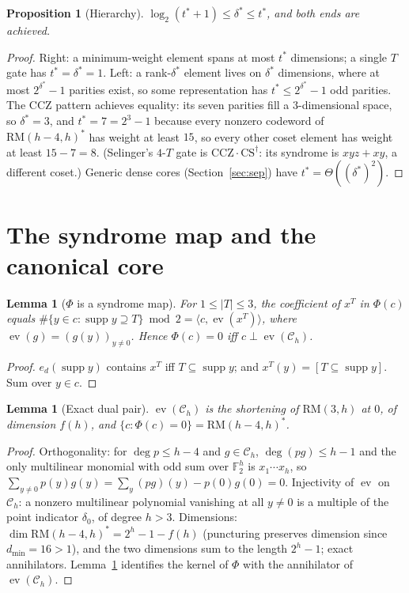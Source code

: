 \documentclass[11pt]{article}
\newtheorem{lemma}[theorem]{Lemma}
\newtheorem{proposition}[theorem]{Proposition}
\theoremstyle{definition}
\theoremstyle{remark}
\newcommand{\F}{\mathbb{F}_2}
\newcommand{\RM}{\mathrm{RM}}
\newcommand{\supp}{\operatorname{supp}}
\newcommand{\ev}{\operatorname{ev}}
\newcommand{\ds}{\delta^{*}}
\newcommand{\ts}{t^{*}}
\newcommand{\Ch}{\mathcal{C}_h}
\newcommand{\ip}[2]{\langle #1,#2\rangle}
\begin{document}
\begin{proposition}[Hierarchy]\label{prop:hier}
$\log_2(\ts+1)\le\ds\le\ts$, and both ends are achieved.
\end{proposition}

\begin{proof}
Right: a minimum-weight element spans at most $\ts$ dimensions; a single $T$ gate has $\ts=\ds=1$.
Left: a rank-$\ds$ element lives on $\ds$ dimensions, where at most $2^{\ds}-1$ parities exist, so some
representation has $\ts\le2^{\ds}-1$ odd parities. The CCZ pattern achieves equality: its seven parities
fill a $3$-dimensional space, so $\ds=3$, and $\ts=7=2^3-1$ because every nonzero codeword of
$\RM(h-4,h)^{*}$ has weight at least $15$, so every other coset element has weight at least $15-7=8$.
(Selinger's $4$-$T$ gate \cite{Sel13} is $\mathrm{CCZ}\cdot\mathrm{CS}^{\dagger}$: its syndrome is $xyz+xy$, a different coset.)
Generic dense cores (Section~\ref{sec:sep}) have $\ts=\Theta((\ds)^{2})$.
\end{proof}

\section{The syndrome map and the canonical core}\label{sec:core}

\begin{lemma}[$\Phi$ is a syndrome map]\label{lem:syndrome}
For $1\le|T|\le3$, the coefficient of $x^T$ in $\Phi(c)$ equals
$\#\{y\in c:\supp y\supseteq T\}\bmod2=\ip{c}{\ev(x^T)}$, where $\ev(g)=(g(y))_{y\ne0}$. Hence $\Phi(c)=0$ iff
$c\perp\ev(\Ch)$.
\end{lemma}
\begin{proof}
$e_d(\supp y)$ contains $x^T$ iff $T\subseteq\supp y$; and $x^T(y)=[T\subseteq\supp y]$. Sum over $y\in c$.
\end{proof}

\begin{lemma}[Exact dual pair]\label{lem:dual}
$\ev(\Ch)$ is the shortening of $\RM(3,h)$ at $0$, of dimension $f(h)$,
and $\{c:\Phi(c)=0\}=\RM(h-4,h)^{*}$.
\end{lemma}
\begin{proof}
Orthogonality: for $\deg p\le h-4$ and $g\in\Ch$, $\deg(pg)\le h-1$ and the only multilinear
monomial with odd sum over $\F^h$ is $x_1\cdots x_h$, so $\sum_{y\ne0}p(y)g(y)=\sum_y(pg)(y)-p(0)g(0)=0$.
Injectivity of $\ev$ on $\Ch$: a nonzero multilinear polynomial vanishing at all $y\ne0$ is a multiple
of the point indicator $\delta_0$, of degree $h>3$. Dimensions: $\dim\RM(h-4,h)^{*}=2^h-1-f(h)$
(puncturing preserves dimension since $d_{\min}=16>1$), and the two dimensions sum to the
length $2^h-1$; exact annihilators. Lemma~\ref{lem:syndrome} identifies the kernel of $\Phi$ with the annihilator of
$\ev(\Ch)$.
\end{proof}
\end{document}
